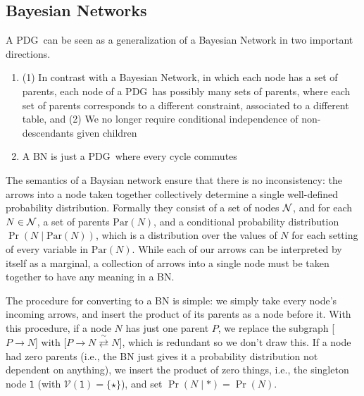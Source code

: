 \documentclass{article}
\newcommand\changeon{\color{note-fg} }
\newcommand\changeoff{\color{black} }
\newcommand{\MN}{PDG}%
\begin{document}
	\subsection{Bayesian Networks} \label{sec:bn-convert}
	\changeon	
	A \MN\ can be seen as a generalization of a Bayesian Network in two important directions. 
	
	\begin{enumerate}
		\item (1) In contrast with a Bayesian Network, in which each node has a set of parents, each node of a \MN\ has possibly many sets of parents, where each set of parents corresponds to a different constraint, associated to a different table, and (2) We no longer require conditional independence of non-descendants given children
		
		\item A BN is just a \MN\ where every cycle commutes
		
		
	\end{enumerate}
	\changeoff
	
	
	The semantics of a Baysian network ensure that there is no inconsistency: the arrows into a node taken together collectively determine a single well-defined probability distribution. Formally they consist of a set of nodes $\cal N$, and for each $N \in \cal N$, a set of parents $\mathrm{Par}(N)$, and a conditional probability distribution $\Pr( N \mid \mathrm{Par}(N))$, which is a distribution over the values of $N$ for each setting of every variable in $\mathrm{Par}(N)$. While each of our arrows can be interpreted by itself as a marginal, a collection of arrows into a single node must be taken together to have any meaning in a BN. 
	
	The procedure for converting to a BN is simple: we simply take every node's incoming arrows, and insert the product of its parents as a node before it. With this procedure, if a node $N$ has just one parent $P$, we replace the subgraph [$P \to N$] with [$P \to N \stackrel\sim\rightleftarrows N$], which is redundant so we don't draw this. If a node had zero parents (i.e., the BN just gives it a probability distribution not dependent on anything), we insert the product of zero things, i.e., the singleton node $\mathsf 1$ (with $\mathcal V(\mathsf 1) = \{\star \}$), and set $\Pr(N \mid *) = \Pr(N)$. 
	
\end{document}
